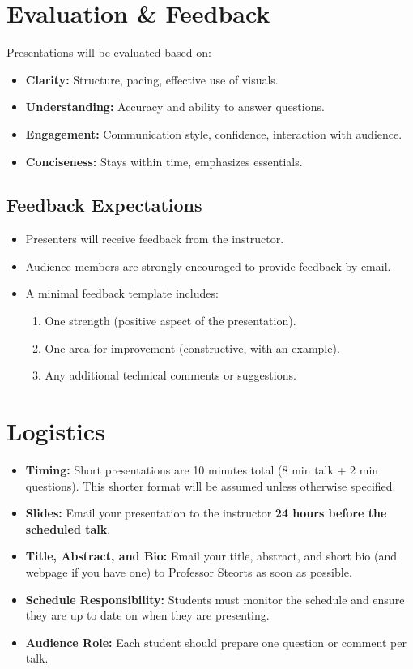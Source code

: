 \documentclass[11pt]{article}
\begin{document}
\section*{Evaluation \& Feedback}
Presentations will be evaluated based on:
\begin{itemize}
    \item \textbf{Clarity:} Structure, pacing, effective use of visuals.
    \item \textbf{Understanding:} Accuracy and ability to answer questions.
    \item \textbf{Engagement:} Communication style, confidence, interaction with audience.
    \item \textbf{Conciseness:} Stays within time, emphasizes essentials.
\end{itemize}

\subsection*{Feedback Expectations}
\begin{itemize}
    \item Presenters will receive feedback from the instructor.  
    \item Audience members are strongly encouraged to provide feedback by email.  
    \item A minimal feedback template includes:
    \begin{enumerate}
        \item One strength (positive aspect of the presentation).
        \item One area for improvement (constructive, with an example).
        \item Any additional technical comments or suggestions.
    \end{enumerate}
\end{itemize}

\section*{Logistics}
\begin{itemize}
    \item \textbf{Timing:} Short presentations are 10 minutes total (8 min talk + 2 min questions). This shorter format will be assumed unless otherwise specified.
    \item \textbf{Slides:} Email your presentation to the instructor \textbf{24 hours before the scheduled talk}.
    \item \textbf{Title, Abstract, and Bio:} Email your title, abstract, and short bio (and webpage if you have one) to Professor Steorts as soon as possible.
    \item \textbf{Schedule Responsibility:} Students must monitor the schedule and ensure they are up to date on when they are presenting.
    \item \textbf{Audience Role:} Each student should prepare one question or comment per talk.
\end{itemize}
\end{document}

